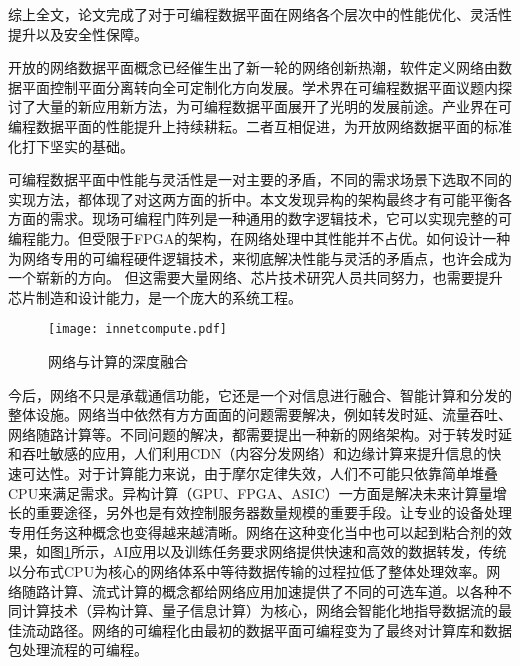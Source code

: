 综上全文，论文完成了对于可编程数据平面在网络各个层次中的性能优化、灵活性提升以及安全性保障。





\label{chap62}

\label{chap621}

开放的网络数据平面概念已经催生出了新一轮的网络创新热潮，软件定义网络由数据平面控制平面分离转向全可定制化方向发展。学术界在可编程数据平面议题内探讨了大量的新应用新方法，为可编程数据平面展开了光明的发展前途。产业界在可编程数据平面的性能提升上持续耕耘。二者互相促进，为开放网络数据平面的标准化打下坚实的基础。

可编程数据平面中性能与灵活性是一对主要的矛盾，不同的需求场景下选取不同的实现方法，都体现了对这两方面的折中。本文发现异构的架构最终才有可能平衡各方面的需求。现场可编程门阵列是一种通用的数字逻辑技术，它可以实现完整的可编程能力。但受限于FPGA的架构，在网络处理中其性能并不占优。如何设计一种为网络专用的可编程硬件逻辑技术，来彻底解决性能与灵活的矛盾点，也许会成为一个崭新的方向。
但这需要大量网络、芯片技术研究人员共同努力，也需要提升芯片制造和设计能力，是一个庞大的系统工程。




\label{chap622}

\begin{figure}[!ht]
	\centering 
	\vspace{-1.5mm} 
	\texttt{[image: innetcompute.pdf]}
	\caption{网络与计算的深度融合} \label{fig:innetcompute}
\end{figure}

今后，网络不只是承载通信功能，它还是一个对信息进行融合、智能计算和分发的整体设施。网络当中依然有方方面面的问题需要解决，例如转发时延、流量吞吐、网络随路计算等。不同问题的解决，都需要提出一种新的网络架构。对于转发时延和吞吐敏感的应用，人们利用CDN（内容分发网络）和边缘计算来提升信息的快速可达性。对于计算能力来说，由于摩尔定律失效，人们不可能只依靠简单堆叠CPU来满足需求。异构计算（GPU、FPGA、ASIC）一方面是解决未来计算量增长的重要途径，另外也是有效控制服务器数量规模的重要手段。让专业的设备处理专用任务这种概念也变得越来越清晰。网络在这种变化当中也可以起到粘合剂的效果，如图\ref{fig:innetcompute}所示，AI应用以及训练任务要求网络提供快速和高效的数据转发，传统以分布式CPU为核心的网络体系中等待数据传输的过程拉低了整体处理效率。网络随路计算、流式计算的概念都给网络应用加速提供了不同的可选车道。以各种不同计算技术（异构计算、量子信息计算）为核心，网络会智能化地指导数据流的最佳流动路径。网络的可编程化由最初的数据平面可编程变为了最终对计算库和数据包处理流程的可编程。










